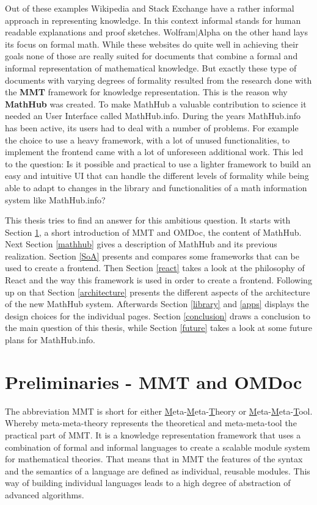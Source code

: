 \documentclass[11pt,a4paper]{article}
\begin{document}
Out of these examples Wikipedia and Stack Exchange have a rather informal approach in representing knowledge.
In this context informal stands for human readable explanations and proof sketches.
Wolfram$|$Alpha on the other hand lays its focus on formal math.
While these websites do quite well in achieving their goals none of those are really suited for documents that combine a formal and informal representation of mathematical knowledge.
But exactly these type of documents with varying degrees of formality resulted from the research done with the \textbf{MMT} framework for knowledge representation.
This is the reason why \textbf{MathHub}\cite{MathHub} was created.
To make MathHub a valuable contribution to science it needed an User Interface called MathHub.info.
During the years MathHub.info has been active, its users had to deal with a number of problems.
For example the choice to use a heavy framework, with a lot of unused functionalities, to implement the frontend came with a lot of unforeseen additional work.
This led to the question: Is it possible and practical to use a lighter framework to build an easy and intuitive UI that can handle the different levels of formality while being able to adapt to changes in the library and functionalities of a math information system like MathHub.info?
\newline

This thesis tries to find an answer for this ambitious question. It starts with Section \ref{preliminaries}, a short introduction of  MMT and OMDoc, the content of MathHub. 
Next Section \ref{mathhub} gives a description of MathHub and its previous realization.
Section \ref{SoA} presents and compares some frameworks that can be used to create a frontend.
Then Section \ref{react} takes a look at the philosophy of React and the way this framework is used in order to create a frontend.
Following up on that Section \ref{architecture} presents the different aspects of the architecture of the new MathHub system.
Afterwards Section \ref{library} and \ref{apps} displays the design choices for the individual pages.
Section \ref{conclusion} draws a conclusion to the main question of this thesis, while Section \ref{future} takes a look at some future plans for MathHub.info.

\section{Preliminaries - MMT and OMDoc} \label{preliminaries}
The abbreviation MMT is short for either \underline{M}eta-\underline{M}eta-\underline{T}heory or \underline{M}eta-\underline{M}eta-\underline{T}ool.
Whereby meta-meta-theory represents the theoretical and meta-meta-tool the practical part of MMT.
It is a knowledge representation framework that uses a combination of formal and informal languages to create a scalable module system for mathematical theories.
That means that in MMT the features of the syntax and the semantics of a language are defined as individual, reusable modules.
This way of building individual languages leads to a high degree of abstraction of advanced algorithms.\cite{mmtsys}
\end{document}
